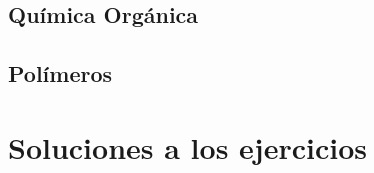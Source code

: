 \documentclass[
    11pt, %
    a4paper, %
]{

}
\begin{document}


    \chapter{Química Orgánica}

    

    \newpage

    


    \chapter{Polímeros}

    

    




    \pagestyle{empty} %









    \part{Soluciones a los ejercicios}



\end{document}
